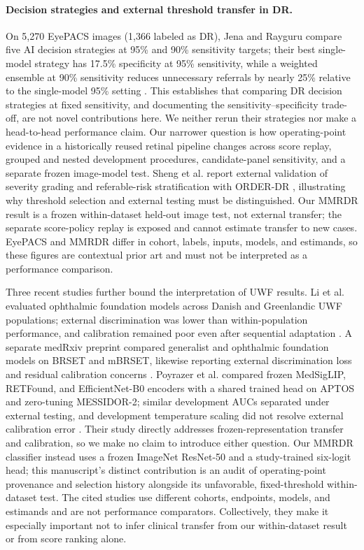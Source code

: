 \documentclass[11pt]{article}
\begin{document}
\paragraph{Decision strategies and external threshold transfer in DR.} On 5,270 EyePACS images (1,366 labeled as DR), Jena and Rayguru compare five AI decision strategies at 95\% and 90\% sensitivity targets; their best single-model strategy has 17.5\% specificity at 95\% sensitivity, while a weighted ensemble at 90\% sensitivity reduces unnecessary referrals by nearly 25\% relative to the single-model 95\% setting \cite{jena2026}. This establishes that comparing DR decision strategies at fixed sensitivity, and documenting the sensitivity--specificity trade-off, are not novel contributions here. We neither rerun their strategies nor make a head-to-head performance claim. Our narrower question is how operating-point evidence in a historically reused retinal pipeline changes across score replay, grouped and nested development procedures, candidate-panel sensitivity, and a separate frozen image-model test. Sheng et al. report external validation of severity grading and referable-risk stratification with ORDER-DR \cite{sheng2026orderdr}, illustrating why threshold selection and external testing must be distinguished. Our MMRDR result is a frozen within-dataset held-out image test, not external transfer; the separate score-policy replay is exposed and cannot estimate transfer to new cases. EyePACS and MMRDR differ in cohort, labels, inputs, models, and estimands, so these figures are contextual prior art and must not be interpreted as a performance comparison.

Three recent studies further bound the interpretation of UWF results. Li et al. evaluated ophthalmic foundation models across Danish and Greenlandic UWF populations; external discrimination was lower than within-population performance, and calibration remained poor even after sequential adaptation \cite{li2026uwf}. A separate medRxiv preprint compared generalist and ophthalmic foundation models on BRSET and mBRSET, likewise reporting external discrimination loss and residual calibration concerns \cite{li2026mbrset}. Poyrazer et al. compared frozen MedSigLIP, RETFound, and EfficientNet-B0 encoders with a shared trained head on APTOS and zero-tuning MESSIDOR-2; similar development AUCs separated under external testing, and development temperature scaling did not resolve external calibration error \cite{poyrazer2026frozen}. Their study directly addresses frozen-representation transfer and calibration, so we make no claim to introduce either question. Our MMRDR classifier instead uses a frozen ImageNet ResNet-50 and a study-trained six-logit head; this manuscript's distinct contribution is an audit of operating-point provenance and selection history alongside its unfavorable, fixed-threshold within-dataset test. The cited studies use different cohorts, endpoints, models, and estimands and are not performance comparators. Collectively, they make it especially important not to infer clinical transfer from our within-dataset result or from score ranking alone.
\end{document}

